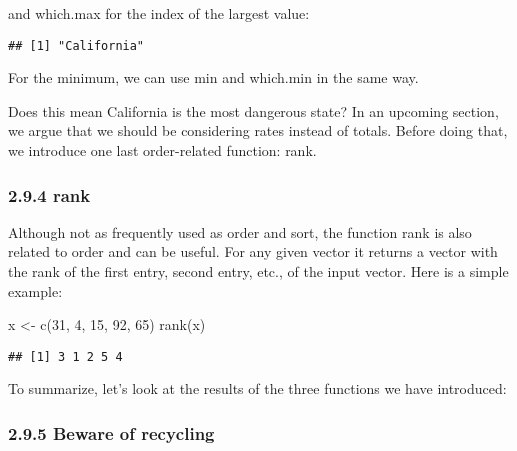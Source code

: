 \documentclass[
]{article}
\newenvironment{Shaded}{\begin{snugshade}}{\end{snugshade}}
\newcommand{\DecValTok}[1]{\textcolor[rgb]{0.00,0.00,0.81}{#1}}
\newcommand{\FunctionTok}[1]{\textcolor[rgb]{0.00,0.00,0.00}{#1}}
\newcommand{\NormalTok}[1]{#1}
\newcommand{\OtherTok}[1]{\textcolor[rgb]{0.56,0.35,0.01}{#1}}
\newcommand{\SpecialCharTok}[1]{\textcolor[rgb]{0.00,0.00,0.00}{#1}}
\begin{document}
and which.max for the index of the largest value:

\begin{Shaded}
\end{Shaded}

\begin{verbatim}
## [1] "California"
\end{verbatim}

For the minimum, we can use min and which.min in the same way.

Does this mean California is the most dangerous state? In an upcoming
section, we argue that we should be considering rates instead of totals.
Before doing that, we introduce one last order-related function: rank.

\hypertarget{rank}{%
\subsubsection{2.9.4 rank}\label{rank}}

Although not as frequently used as order and sort, the function rank is
also related to order and can be useful. For any given vector it returns
a vector with the rank of the first entry, second entry, etc., of the
input vector. Here is a simple example:

\begin{Shaded}
\begin{Highlighting}[]
\NormalTok{x }\OtherTok{\textless{}{-}} \FunctionTok{c}\NormalTok{(}\DecValTok{31}\NormalTok{, }\DecValTok{4}\NormalTok{, }\DecValTok{15}\NormalTok{, }\DecValTok{92}\NormalTok{, }\DecValTok{65}\NormalTok{)}
\FunctionTok{rank}\NormalTok{(x)}
\end{Highlighting}
\end{Shaded}

\begin{verbatim}
## [1] 3 1 2 5 4
\end{verbatim}

To summarize, let's look at the results of the three functions we have
introduced:

\hypertarget{beware-of-recycling}{%
\subsubsection{2.9.5 Beware of recycling}\label{beware-of-recycling}}
\end{document}
